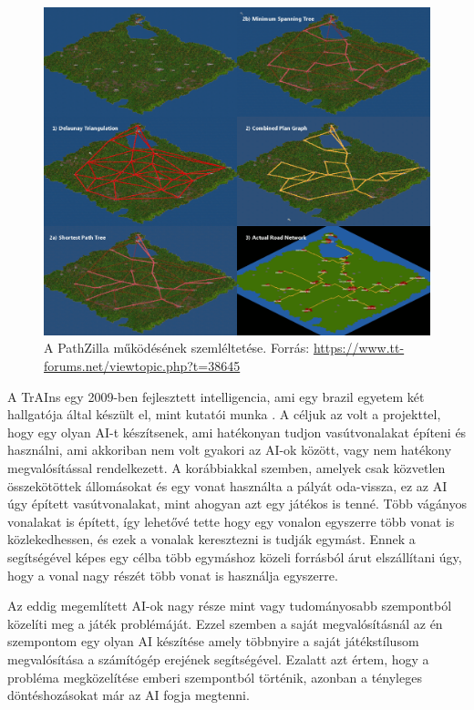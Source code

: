 \begin{figure}
	\centering
	\includegraphics[scale=1]{images/pathzilla.png}
	\caption{A PathZilla működésének szemléltetése. Forrás: \url{https://www.tt-forums.net/viewtopic.php?t=38645}}
	\label{fig:pathzilla}
\end{figure}

A TrAIns egy 2009-ben fejlesztett intelligencia, ami egy brazil egyetem két hallgatója által készült el, mint kutatói munka \cite{rios2009trains}. A céljuk az volt a projekttel, hogy egy olyan AI-t készítsenek, ami hatékonyan tudjon vasútvonalakat építeni és használni, ami akkoriban nem volt gyakori az AI-ok között, vagy nem hatékony megvalósítással rendelkezett. A korábbiakkal szemben, amelyek csak közvetlen összekötöttek állomásokat és egy vonat használta a pályát oda-vissza, ez az AI úgy épített vasútvonalakat, mint ahogyan azt egy játékos is tenné. Több vágányos vonalakat is épített, így lehetővé tette hogy egy vonalon egyszerre több vonat is közlekedhessen, és ezek a vonalak keresztezni is tudják egymást. Ennek a segítségével képes egy célba több egymáshoz közeli forrásból árut elszállítani úgy, hogy a vonal nagy részét több vonat is használja egyszerre.


Az eddig megemlített AI-ok nagy része mint vagy tudományosabb szempontból közelíti meg a játék problémáját. Ezzel szemben a saját megvalósításnál az én szempontom egy olyan AI készítése amely többnyire a saját játékstílusom megvalósítása a számítógép erejének segítségével. Ezalatt azt értem, hogy a probléma megközelítése emberi szempontból történik, azonban a tényleges döntéshozásokat már az AI fogja megtenni.

